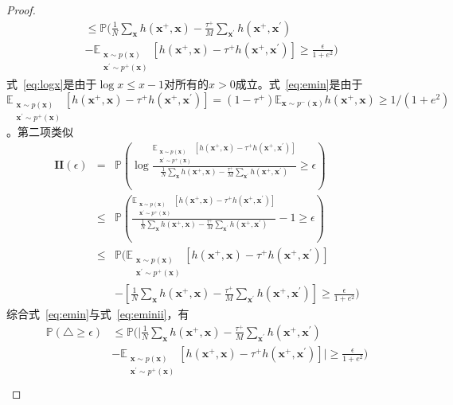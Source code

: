 \begin{lemma}
\begin{proof}
\begin{align}
			&\leq \mathbb{P} ( \frac{1}{N}  \sum_{\mathbf{x}} h(\mathbf{x}^+,\mathbf{x})  -\frac{\tau^+}{M} \sum_{\mathbf{x}^\prime} h(\mathbf{x}^+,\mathbf{x}^\prime)  \nonumber \\ &-\mathbb{E}_{\substack{\mathbf x \sim p(\mathbf x) \\ \mathbf x^\prime \sim p^+(\mathbf x)}} [ h(\mathbf{x}^+,\mathbf{x}) - \tau^+h(\mathbf{x}^+,\mathbf{x}^\prime)] \geq \frac{\epsilon}{1+e^2}  ) \label{eq:emin}
		\end{align}
式~\eqref{eq:logx}是由于$\log x \leq x-1$对所有的$x>0$成立。式~\eqref{eq:emin}是由于 $\mathbb{E}_{\substack{\mathbf x \sim p(\mathbf x) \\ \mathbf x^\prime \sim p^+(\mathbf x)}} [ h(\mathbf{x}^+,\mathbf{x}) - \tau^+h(\mathbf{x}^+,\mathbf{x}^\prime)] =(1-\tau^+)\mathbb{E}_{\mathbf x \sim p^-(\mathbf x)}  h(\mathbf{x}^+,\mathbf{x}) \geq 1/(1+e^2)$。第二项类似
		\begin{eqnarray}
\mathbf{II}(\epsilon)&=& \mathbb{P} \left(\log 
			\frac{\mathbb{E}_{\substack{\mathbf x \sim p(\mathbf x) \\ \mathbf x^\prime \sim p^+(\mathbf x)}} [ h(\mathbf{x}^+,\mathbf{x}) - \tau^+h(\mathbf{x}^+,\mathbf{x}^\prime)]}{\frac{1}{N}  \sum_{\mathbf{x}} h(\mathbf{x}^+,\mathbf{x})  -\frac{\tau^+}{M} \sum_{\mathbf{x}^\prime} h(\mathbf{x}^+,\mathbf{x}^\prime)} \geq \epsilon  \right) \nonumber\\
			&\leq& \mathbb{P} \left( \frac{\mathbb{E}_{\substack{\mathbf x \sim p(\mathbf x) \\ \mathbf x^\prime \sim p^+(\mathbf x)}} [ h(\mathbf{x}^+,\mathbf{x}) - \tau^+h(\mathbf{x}^+,\mathbf{x}^\prime)]}{\frac{1}{N}  \sum_{\mathbf{x}} h(\mathbf{x}^+,\mathbf{x})  -\frac{\tau^+}{M} \sum_{\mathbf{x}^\prime} h(\mathbf{x}^+,\mathbf{x}^\prime)} -1 \geq \epsilon  \right) \label{eq:logxii}\nonumber\\
			&\leq& \mathbb{P} (\mathbb{E}_{\substack{\mathbf x \sim p(\mathbf x) \\ \mathbf x^\prime \sim p^+(\mathbf x)}} [ h(\mathbf{x}^+,\mathbf{x}) - \tau^+h(\mathbf{x}^+,\mathbf{x}^\prime)]  \nonumber \\ &&- [\frac{1}{N}  \sum_{\mathbf{x}} h(\mathbf{x}^+,\mathbf{x})  -\frac{\tau^+}{M} \sum_{\mathbf{x}^\prime} h(\mathbf{x}^+,\mathbf{x}^\prime)]  \geq \frac{\epsilon}{1+e^2}  ) \label{eq:eminii}
		\end{eqnarray}
综合式~\eqref{eq:emin}与式~\eqref{eq:eminii}，有
		\begin{align}
\mathbb{P}(\triangle \geq \epsilon)
			&\leq \mathbb{P} ( |\frac{1}{N}  \sum_{\mathbf{x}} h(\mathbf{x}^+,\mathbf{x})  -\frac{\tau^+}{M} \sum_{\mathbf{x}^\prime} h(\mathbf{x}^+,\mathbf{x}^\prime)  \label{eq:abs}\\ &-\mathbb{E}_{\substack{\mathbf x \sim p(\mathbf x) \\ \mathbf x^\prime \sim p^+(\mathbf x)}} [ h(\mathbf{x}^+,\mathbf{x}) - \tau^+h(\mathbf{x}^+,\mathbf{x}^\prime)]| \geq \frac{\epsilon}{1+e^2}  ) \nonumber\\

\end{align}
\end{proof}
\end{lemma}
